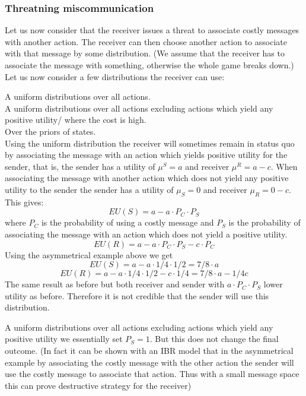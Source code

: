\documentclass[10]{article}
\begin{document}
\subsubsection{Threatning miscommunication}
Let us now consider that the receiver issues a threat to associate costly messages with another action. The receiver can then choose another action to associate with that message by some distribution. (We assume that the receiver has to associate the message with something, otherwise the whole game breaks down.) Let us now consider a few distributions the receiver can use:

A uniform distributions over all actions. \\
A uniform distributions over all actions excluding actions which yield any positive utility/ where the cost is high. \\%
Over the priors of states. \\

Using the uniform distribution the receiver will sometimes remain in status quo by associating the message with an action which yields positive utility for the sender, that is, the sender has a utility of $\mu^S=a$ and receiver $\mu^R=a-c$. When associating the message with another action which does not yield any positive utility to the sender the sender has a utility of $\mu_S=0$ and receiver $\mu_R=0-c$. %
This gives:
$$EU(S)=a-a \cdot P_C \cdot P_S$$
 where $P_C$ is the probability of using a costly message and $P_S$ is the probability of associating the message with an action which does not yield a positive utility.
 $$EU(R)=a-a \cdot P_C \cdot P_S - c \cdot P_C$$
 Using the asymmetrical example above we get
 $$EU(S)=a-a \cdot 1/4 \cdot 1/2=7/8 \cdot a$$
 $$EU(R)=a-a \cdot 1/4 \cdot 1/2 - c \cdot 1/4=7/8 \cdot a - 1/4c$$
 The same result as before but both receiver and sender with $a \cdot P_C \cdot P_S$ lower utility as before. Therefore it is not credible that the sender will use this distribution.

A uniform distributions over all actions excluding actions which yield any positive utility we essentially set $P_S=1$. But this does not change the final outcome. (In fact it can be shown with an IBR model that in the asymmetrical example by associating the costly message with the other action the sender will use the costly message to associate that action. Thus with a small message space this can prove destructive strategy for the receiver)
\end{document}
